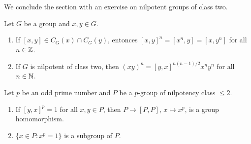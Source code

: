 We conclude the section with an exercise
on nilpotent groups of class two. 

\begin{exercise}
Let $G$ be a group and $x,y\in G$.  
\begin{enumerate}
	\item If $[x,y]\in C_G(x)\cap C_G(y)$, entonces
	$[x,y]^n=[x^n,y]=[x,y^n]$
	for all $n\in\mathbb{Z}$.
	\item If $G$ is nilpotent of class two, then $(xy)^n=[y,x]^{n(n-1)/2}x^ny^n$ 
	for all $n\in\mathbb{N}$.
\end{enumerate}	
\end{exercise}

\begin{exercise}
	Let $p$ be an odd prime number and  
	$P$ be a $p$-group of nilpotency class $\leq2$. 
	\begin{enumerate}
	\item 	If $[y,x]^p=1$ for all $x,y\in P$, then $P\to [P,P]$,
	$x\mapsto x^p$, is a group homomorphism. 
	\item $\{x\in P:x^p=1\}$ is a subgroup of $P$. 
	\end{enumerate}
\end{exercise}




%
%

%

